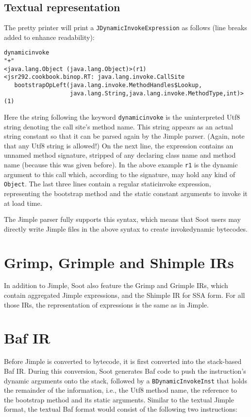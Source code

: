 \documentclass{article}
\begin{document}
\subsection*{Textual representation}
The pretty printer will print a \texttt{JDynamicInvokeExpression} as follows
(line breaks added to enhance readability):
\begin{verbatim}
dynamicinvoke
"+"
<java.lang.Object (java.lang.Object)>(r1)
<jsr292.cookbook.binop.RT: java.lang.invoke.CallSite
   bootstrapOpLeft(java.lang.invoke.MethodHandles$Lookup,
                   java.lang.String,java.lang.invoke.MethodType,int)>(1)
\end{verbatim}

Here the string following the keyword \texttt{dynamicinvoke} is the
uninterpreted Utf8 string denoting the call site's method name. This string
appears as an actual string constant so that it can be parsed again by the
Jimple parser. (Again, note that any Utf8 string is allowed!)
On the next line, the expression contains an unnamed method signature, stripped
of any declaring class name and method name (because this was given before). In
the above example \texttt{r1} is the dynamic argument to this call which,
according to the signature, may hold any kind of \texttt{Object}. The last three
lines contain a regular staticinvoke expression, representing the bootstrap
method and the static constant arguments to invoke it at load time.

The Jimple parser fully supports this syntax, which means that Soot users may
directly write Jimple files in the above syntax to create invokedynamic
bytecodes.

\section{Grimp, Grimple and Shimple IRs}
In addition to Jimple, Soot also feature the Grimp and Grimple IRs, which
contain aggregated Jimple expressions, and the Shimple IR for SSA form. For all
those IRs, the representation of expressions is the same as in Jimple.

\section{Baf IR}
Before Jimple is converted to bytecode, it is first converted into the
stack-based Baf IR. During this conversion, Soot generates Baf code to push the
instruction's dynamic arguments onto the stack, followed by a
\texttt{BDynamicInvokeInst} that holds the remainder of the information, i.e.,
the Utf8 method name, the reference to the bootstrap method and its static
arguments. Similar to the textual Jimple format, the textual Baf format would
consist of the following two instructions:
\end{document}
